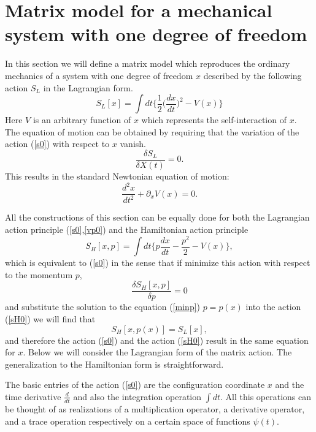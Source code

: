 \documentclass[a4paper,11pt]{article}
\begin{document}
\section{Matrix model for a mechanical system with one degree of
freedom} \label{sec2} In this section we will define a matrix
model which reproduces the ordinary mechanics of a system with one
degree of freedom $x$ described by the following action  $S_{L}$
in the Lagrangian form.
\begin{equation}
S_{L}[x] =\int dt \Big\{ \frac{1}{2}\Big(\frac{dx}{dt} \Big)^2 -
V(x) \Big\} \label{s0}
\end{equation}
Here $V$ is an arbitrary function of $x$ which represents the
self-interaction of $x$. The equation of motion can be obtained by
requiring that the variation of  the action (\ref{s0}) with
respect to $x$ vanish.
\begin{equation}
\frac{\delta S_{L}}{\delta X(t)}=0. \label{vp0}
\end{equation}
This results in the standard Newtonian equation of motion:
\begin{equation}
\frac{d^2x}{dt^2}+\partial_x V(x)=0. \label{ne}
\end{equation}

All the constructions of this section can be equally done for both
the Lagrangian action principle (\ref{s0},\ref{vp0}) and the
Hamiltonian action principle
\begin{equation}
S_{H}[x,p] =\int dt \Big\{ p\frac{dx}{dt} -\frac{p^2}{2} - V(x)
\Big\}, \label{sH0}
\end{equation}
which is equivalent to (\ref{s0}) in the sense that  if minimize
this action with respect to the momentum $p$,
\begin{equation}
\frac{\delta S_{H}[x,p]}{\delta p}=0 \label{minp}
\end{equation}
and substitute the solution to the equation (\ref{minp}) $p=p(x)$
into the action (\ref{sH0}) we will find that
\begin{equation}
S_{H}[x,p(x)]=S_L[x],
\end{equation}
and therefore the action (\ref{s0}) and the action (\ref{sH0})
result in the same equation for $x$.  Below we will consider the
Lagrangian form of the matrix action. The generalization to the
Hamiltonian form is straightforward.

The basic entries of the action (\ref{s0}) are the configuration
coordinate $x$ and the time derivative $\frac{d}{dt}$ and also the
integration operation  $\int dt$. All this operations can be
thought of as realizations of a multiplication operator, a
derivative operator, and a trace operation respectively on a
certain space of functions $\psi(t)$.
\end{document}
